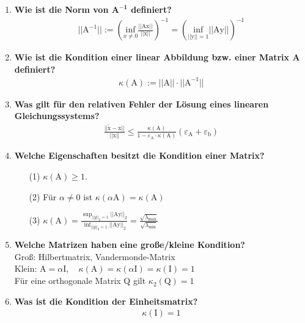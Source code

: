 \begin{enumerate}
		\item \textbf{Wie ist die Norm von \(\mathbf{A^{-1}}\) definiert?} \\
			\begin{align*}
				||\text{A}^{-1}||:=\left(\underset{x\neq0}{\text{inf}}\frac{||\text{Ax}||}{||\text{x}||}\right)^{-1} = \left(\underset{||\text{y}||=1}{\text{inf}}||\text{Ay}||\right)^{-1}
			\end{align*}
		
		\item \textbf{Wie ist die Kondition einer linear Abbildung bzw. einer Matrix A definiert?}
			\begin{align*}
				\kappa(\text{A}):=||\text{A}||\cdot||\text{A}^{-1}||
			\end{align*}
		
		\item \textbf{Was gilt für den relativen Fehler der Lösung eines linearen Gleichungssystems?}
			\begin{align*}
				\frac{||\tilde{\text{x}}-\text{x}||}{||\text{x}||}\leq \frac{\kappa(\text{A})}{1-\varepsilon_\text{A}\cdot\kappa(\text{A})}(\varepsilon_\text{A}+\varepsilon_\text{b})
			\end{align*}
		
		\item \textbf{Welche Eigenschaften besitzt die Kondition einer Matrix?}
			\begin{enumerate}
				\item[(1)] \(\kappa(\text{A})\geq1\).
				\item[(2)] Für \(\alpha\neq0\) ist \(\kappa(\alpha\text{A})=\kappa(\text{A})\)
				\item[(3)] \(\kappa(\text{A})=\frac{\sup_{||y||_2=1}||\text{Ay}||_2}{\inf_{||y||_2=1}||\text{Ay}||_2}=
				\frac{\sqrt{\lambda_{\max}}}{\sqrt{\lambda_{\min}}}\)
			\end{enumerate}
		
		\item \textbf{Welche Matrizen haben eine große/kleine Kondition?} \\
			Groß: Hilbertmatrix, Vandermonde-Matrix \\
			Klein: \(\text{A}=\alpha\text{I}, \quad \kappa(\text{A})=\kappa(\alpha\text{I})=\kappa(\text{I})=1\)\\
			\mbox{}\hspace{0.88cm} Für eine orthogonale Matrix Q gilt \(\kappa_2(\text{Q})=1\)
		
		\item \textbf{Was ist die Kondition der Einheitsmatrix?}
			\begin{align*}
				\kappa(\text{I})=1
			\end{align*}
		

\end{enumerate}
